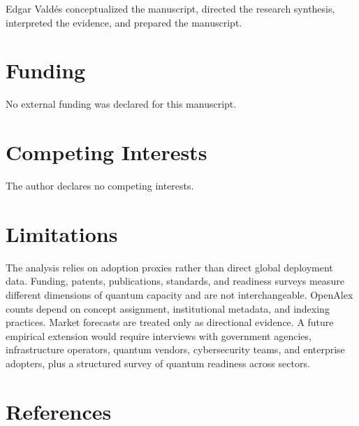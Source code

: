 \documentclass[
  11pt,
  letterpaper,
]{article}
\begin{document}
Edgar Valdés conceptualized the manuscript, directed the research
synthesis, interpreted the evidence, and prepared the manuscript.

\section{Funding}\label{funding}

No external funding was declared for this manuscript.

\section{Competing Interests}\label{competing-interests}

The author declares no competing interests.

\section{Limitations}\label{limitations}

The analysis relies on adoption proxies rather than direct global
deployment data. Funding, patents, publications, standards, and
readiness surveys measure different dimensions of quantum capacity and
are not interchangeable. OpenAlex counts depend on concept assignment,
institutional metadata, and indexing practices. Market forecasts are
treated only as directional evidence. A future empirical extension would
require interviews with government agencies, infrastructure operators,
quantum vendors, cybersecurity teams, and enterprise adopters, plus a
structured survey of quantum readiness across sectors.

\section{References}\label{references}
\end{document}
